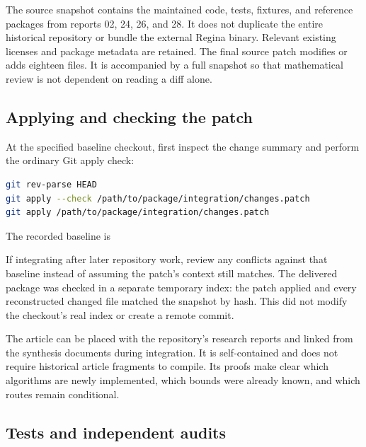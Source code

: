 The source snapshot contains the maintained  code, tests,
fixtures, and reference packages from reports 02, 24, 26, and 28. It does
not duplicate the entire historical repository or bundle the external
Regina binary. Relevant existing licenses and package metadata are retained.
The final source patch modifies or adds eighteen files. It is accompanied
by a full snapshot so that mathematical review is not dependent on reading
a diff alone.

\subsection{Applying and checking the patch}

At the specified baseline checkout, first inspect the change summary and
perform the ordinary Git apply check:
\par\noindent\begin{minipage}{\linewidth}
\begin{lstlisting}[language=bash]
git rev-parse HEAD
git apply --check /path/to/package/integration/changes.patch
git apply /path/to/package/integration/changes.patch
\end{lstlisting}
\end{minipage}\par

The recorded baseline is
\begin{center}\small\baseline\end{center}
If integrating after later repository work, review any conflicts against
that baseline instead of assuming the patch's context still matches.
The delivered package was checked in a separate temporary index: the patch
applied and every reconstructed changed file matched the snapshot by hash.
This did not modify the checkout's real index or create a remote commit.

The article can be placed with the repository's research reports and linked
from the synthesis documents during integration. It is self-contained and
does not require historical article fragments to compile. Its proofs make
clear which algorithms are newly implemented, which bounds were already
known, and which routes remain conditional.

\subsection{Tests and independent audits}

